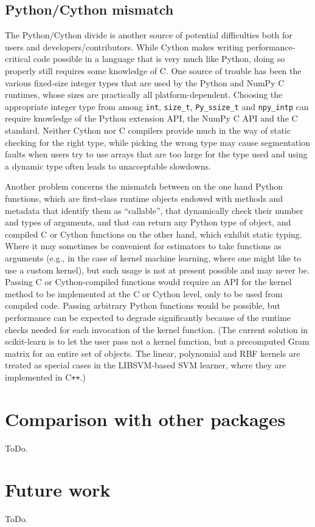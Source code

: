 \documentclass[a4paper,twocolumn]{article}
\DeclareRobustCommand{\VAN}[3]{#2}
\begin{document}
\subsection{Python/Cython mismatch}

The Python/Cython divide is another source of potential difficulties
both for users and developers/contributors.
While Cython makes writing performance-critical code possible
in a language that is very much like Python,
doing so properly still requires some knowledge of C.
One source of trouble has been the various fixed-size integer types
that are used by the Python and NumPy C runtimes,
whose sizes are practically all platform-dependent.
Choosing the appropriate integer type from among
\texttt{int}, \texttt{size\_t}, \texttt{Py\_ssize\_t} and \texttt{npy\_intp}
can require knowledge of the Python extension API,
the NumPy C API and the C standard.
Neither Cython nor C compilers provide much in the way of static checking
for the right type,
while picking the wrong type may cause segmentation faults
when users try to use arrays that are too large for the type used
and using a dynamic type often leads to unacceptable slowdowns.

Another problem concerns the mismatch between on the one hand Python functions,
which are first-class runtime objects endowed with methods and metadata
that identify them as ``callable'',
that dynamically check their number and types of arguments,
and that can return any Python type of object,
and compiled C or Cython functions on the other hand,
which exhibit static typing.
Where it may sometimes be convenient for estimators
to take functions as arguments
(e.g., in the case of kernel machine learning,
where one might like to use a custom kernel),
but such usage is not at present possible and may never be.
Passing C or Cython-compiled functions would require an API
for the kernel method to be implemented at the C or Cython level,
only to be used from compiled code.
Passing arbitrary Python functions would be possible,
but performance can be expected to degrade significantly
because of the runtime checks needed for each invocation of the kernel function.
(The current solution in scikit-learn is to let the user pass
not a kernel function, but a precomputed Gram matrix
for an entire set of objects.
The linear, polynomial and RBF kernels are treated as special cases in
the \textsf{LIBSVM}-based SVM learner,
where they are implemented in C{}\verb!++!.)

\section{Comparison with other packages}

ToDo.

\section{Future work}

ToDo.


\DeclareRobustCommand{\VAN}[3]{#3}

\end{document}
